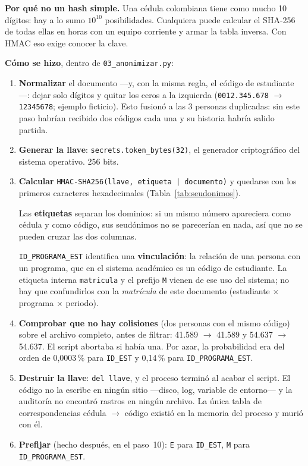 \documentclass[11pt,a4paper,twoside,twocolumn]{article}
\newcommand{\cod}[1]{\nolinkurl{#1}}
\begin{document}
\textbf{Por qué no un hash simple.} Una cédula colombiana tiene como mucho 10 dígitos: hay a lo
sumo $10^{10}$ posibilidades. Cualquiera puede calcular el SHA-256 de todas ellas en horas con un
equipo corriente y armar la tabla inversa. Con HMAC eso exige conocer la clave.

\textbf{Cómo se hizo}, dentro de \cod{03_anonimizar.py}:

\begin{enumerate}[leftmargin=*,itemsep=2pt,topsep=0pt]
  \item \textbf{Normalizar} el documento ---y, con la misma regla, el código de estudiante---:
  dejar solo dígitos y quitar los ceros a la izquierda (\cod{0012.345.678} $\to$ \cod{12345678};
  ejemplo ficticio). Esto fusionó a las 3 personas duplicadas: sin este paso habrían recibido
  dos códigos cada una y su historia habría salido partida.
  \item \textbf{Generar la llave}: \cod{secrets.token_bytes(32)}, el generador criptográfico del
  sistema operativo. 256 bits.
  \item \textbf{Calcular} \texttt{HMAC-SHA256(llave, etiqueta | documento)} y quedarse con los
  primeros caracteres hexadecimales (Tabla~\ref{tab:seudonimos}).

  Las \textbf{etiquetas} separan los dominios: si un mismo número apareciera como cédula y como
  código, sus seudónimos no se parecerían en nada, así que no se pueden cruzar las dos columnas.

  \cod{ID_PROGRAMA_EST} identifica una \textbf{vinculación}: la relación de una persona con un
  programa, que en el sistema académico es un código de estudiante. La etiqueta interna
  \cod{matricula} y el prefijo \cod{M} vienen de ese uso del sistema; no hay que confundirlos con
  la \emph{matrícula} de este documento (estudiante $\times$ programa $\times$ periodo).
  \item \textbf{Comprobar que no hay colisiones} (dos personas con el mismo código) sobre el
  archivo completo, antes de filtrar: 41.589 $\to$ 41.589 y 54.637 $\to$ 54.637. El script
  abortaba si había una. Por azar, la probabilidad era del orden de 0,0003\,\% para
  \cod{ID_EST} y 0,14\,\% para \cod{ID_PROGRAMA_EST}.
  \item \textbf{Destruir la llave}: \texttt{del llave}, y el proceso terminó al acabar el script. El
  código no la escribe en ningún sitio ---disco, log, variable de entorno--- y la auditoría no
  encontró rastros en ningún archivo. La única tabla de correspondencias cédula $\to$ código
  existió en la memoria del proceso y murió con él.
  \item \textbf{Prefijar} (hecho después, en el paso~10): \cod{E} para \cod{ID_EST}, \cod{M}
  para \cod{ID_PROGRAMA_EST}.
\end{enumerate}
\end{document}
